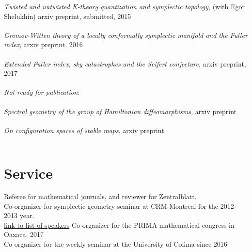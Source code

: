 \documentclass[overlapped,line,letterpaper]{res}
\begin{document}
\begin{resume}
\emph {Twisted and untwisted K-theory quantization and symplectic
topology}, (with Egor Shelukhin) arxiv preprint, submitted,  2015 \\\\
\emph {Gromov-Witten theory of a locally conformally symplectic manifold and the
Fuller index}, arxiv preprint, 2016 \\\\
\emph {Extended Fuller index, sky catastrophes and the Seifert conjecture}, arxiv preprint, 2017 \\\\
\emph {Not ready for publication}: \\\\
\emph{Spectral geometry of the group of Hamiltonian diffeomorphisms},  arxiv preprint \\\\
 {\em {On configuration spaces of stable maps}}, arxiv preprint \\\\ 
\section {\sc Service}
Referee for mathematical journals, and reviewer for Zentralblatt. \\
Co-organizer for symplectic geometry seminar
at CRM-Montreal for the 2012-2013 year. \\
\href{https://docs.google.com/spreadsheet/ccc?key=0AlBCuxjt683fdHYzY2VaSWl1TU1lckctNjJWVndyTHc&usp=docslist_api}
{link to list of speakers}
Co-organizer for the PRIMA mathematical congress in Oaxaca, 2017 \\
Co-organizer for the weekly seminar at the University of Colima since 2016 \\

\end{resume}
\end{document}

